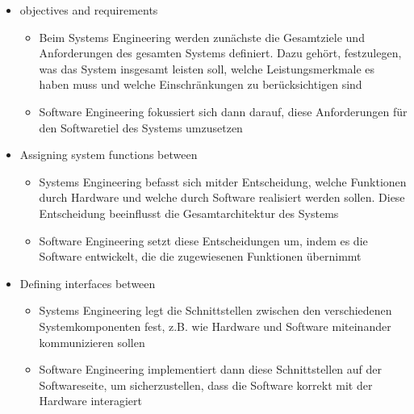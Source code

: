 \begin{defBox}[title=Systems Engineering (Systemtechnik) vs. Software Engineering]
    \begin{itemize}
        \item {} objectives and requirements
        \begin{infoBox}
            \begin{itemize}
                \item Beim Systems Engineering werden zunächste die Gesamtziele und Anforderungen des gesamten Systems definiert. Dazu gehört, festzulegen, was das System insgesamt leisten soll, welche Leistungsmerkmale es haben muss und welche Einschränkungen zu berücksichtigen sind
                \item Software Engineering fokussiert sich dann darauf, diese Anforderungen für den Softwaretiel des Systems umzusetzen
            \end{itemize}
        \end{infoBox}
        \item Assigning system functions between 
        \begin{infoBox}
            \begin{itemize}
                \item Systems Engineering befasst sich mitder Entscheidung, welche Funktionen durch Hardware und welche durch Software realisiert werden sollen. Diese Entscheidung beeinflusst die Gesamtarchitektur des Systems
                \item Software Engineering setzt diese Entscheidungen um, indem es die Software entwickelt, die die zugewiesenen Funktionen übernimmt
            \end{itemize}
        \end{infoBox}
        \item Defining interfaces between 
        \begin{infoBox}
            \begin{itemize}
                \item Systems Engineering legt die Schnittstellen zwischen den verschiedenen Systemkomponenten fest, z.B. wie Hardware und Software miteinander kommunizieren sollen
                \item Software Engineering implementiert dann diese Schnittstellen auf der Softwareseite, um sicherzustellen, dass die Software korrekt mit der Hardware interagiert
            \end{itemize}

\end{infoBox}
\end{itemize}
\end{defBox}

